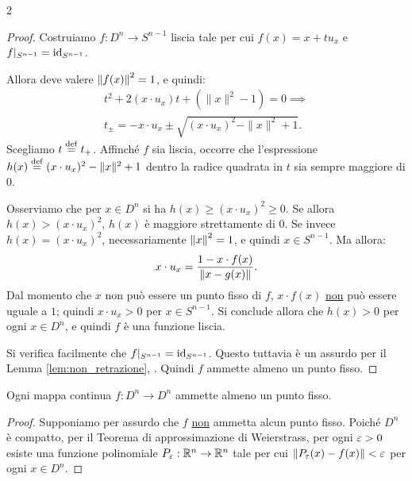 \begin{multicols*}{2}
\begin{proof}
        Costruiamo $f : D^n \to S^{n-1}$ liscia tale per cui $f(x) = x + t u_x$ e
        $f\arrowvert_{S^{n-1}} = \operatorname{id}_{S^{n-1}}$. \smallskip

        Allora deve valere $\left\lVert f(x) \right\rVert^2 = 1$, e quindi:
        \begin{equation*}
            \begin{aligned}
                t^2 + 2(x \cdot u_x) t + (\|x\|^2 - 1) = 0 \implies \\
                t_{\pm} = - x \cdot u_x \pm \sqrt{(x \cdot u_x)^2 - \|x\|^2 + 1}.
            \end{aligned}
        \end{equation*}
        Scegliamo $t \overset{\mathrm{def}}{=} t_+$. Affinché $f$ sia liscia, occorre che l'espressione
        $h(x) \overset{\mathrm{def}}{=} (x \cdot u_x)^2 - \|x\|^2 + 1$ dentro la radice quadrata in $t$ sia sempre maggiore di $0$. \smallskip

        Osserviamo che per $x \in D^n$ si ha $h(x) \geq (x \cdot u_x)^2 \geq 0$. Se allora $h(x) > (x \cdot u_x)^2$,
        $h(x)$ è maggiore strettamente di $0$. Se invece $h(x) = (x \cdot u_x)^2$, necessariamente $\left\lVert x \right\rVert^2 = 1$,
        e quindi $x \in S^{n-1}$. Ma allora:
        \[
            x \cdot u_x = \frac{1 - x \cdot f(x)}{\left\lVert x - g(x) \right\rVert}.
        \]
        Dal momento che $x$ non può essere un punto fisso di $f$, $x \cdot f(x)$ \underline{non} può essere uguale a $1$; quindi
        $x \cdot u_x > 0$ per $x \in S^{n-1}$. Si conclude allora che $h(x) > 0$ per ogni $x \in D^n$, e quindi $f$
        è una funzione liscia. \smallskip

        Si verifica facilmente che $f\arrowvert_{S^{n-1}} = \operatorname{id}_{S^{n-1}}$. Questo tuttavia è un assurdo
        per il Lemma \ref{lem:non_retrazione}, \Lightning. Quindi $f$ ammette almeno un punto fisso.
    \end{proof}

    \begin{theorem}
        Ogni mappa continua $f : D^n \to D^n$ ammette almeno un punto fisso.
    \end{theorem}

    \begin{proof}
        Supponiamo per assurdo che $f$ \underline{non} ammetta alcun punto fisso. Poiché $D^n$
        è compatto, per il Teorema di approssimazione di Weierstrass, per ogni $\varepsilon > 0$
        esiste una funzione polinomiale $P_\varepsilon : \mathbb{R}^n \to \mathbb{R}^n$ tale per cui
        $\left\lVert P_\varepsilon(x) - f(x) \right\rVert < \varepsilon$ per ogni $x \in D^n$. \smallskip


\end{proof}
\end{multicols*}
